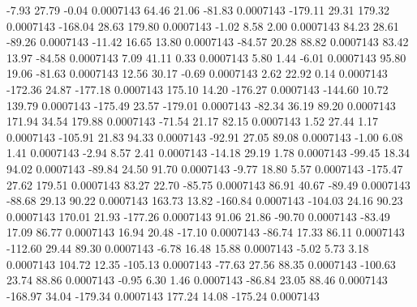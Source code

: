        -7.93       27.79       -0.04     0.0007143
       64.46       21.06      -81.83     0.0007143
     -179.11       29.31      179.32     0.0007143
     -168.04       28.63      179.80     0.0007143
       -1.02        8.58        2.00     0.0007143
       84.23       28.61      -89.26     0.0007143
      -11.42       16.65       13.80     0.0007143
      -84.57       20.28       88.82     0.0007143
       83.42       13.97      -84.58     0.0007143
        7.09       41.11        0.33     0.0007143
        5.80        1.44       -6.01     0.0007143
       95.80       19.06      -81.63     0.0007143
       12.56       30.17       -0.69     0.0007143
        2.62       22.92        0.14     0.0007143
     -172.36       24.87     -177.18     0.0007143
      175.10       14.20     -176.27     0.0007143
     -144.60       10.72      139.79     0.0007143
     -175.49       23.57     -179.01     0.0007143
      -82.34       36.19       89.20     0.0007143
      171.94       34.54      179.88     0.0007143
      -71.54       21.17       82.15     0.0007143
        1.52       27.44        1.17     0.0007143
     -105.91       21.83       94.33     0.0007143
      -92.91       27.05       89.08     0.0007143
       -1.00        6.08        1.41     0.0007143
       -2.94        8.57        2.41     0.0007143
      -14.18       29.19        1.78     0.0007143
      -99.45       18.34       94.02     0.0007143
      -89.84       24.50       91.70     0.0007143
       -9.77       18.80        5.57     0.0007143
     -175.47       27.62      179.51     0.0007143
       83.27       22.70      -85.75     0.0007143
       86.91       40.67      -89.49     0.0007143
      -88.68       29.13       90.22     0.0007143
      163.73       13.82     -160.84     0.0007143
     -104.03       24.16       90.23     0.0007143
      170.01       21.93     -177.26     0.0007143
       91.06       21.86      -90.70     0.0007143
      -83.49       17.09       86.77     0.0007143
       16.94       20.48      -17.10     0.0007143
      -86.74       17.33       86.11     0.0007143
     -112.60       29.44       89.30     0.0007143
       -6.78       16.48       15.88     0.0007143
       -5.02        5.73        3.18     0.0007143
      104.72       12.35     -105.13     0.0007143
      -77.63       27.56       88.35     0.0007143
     -100.63       23.74       88.86     0.0007143
       -0.95        6.30        1.46     0.0007143
      -86.84       23.05       88.46     0.0007143
     -168.97       34.04     -179.34     0.0007143
      177.24       14.08     -175.24     0.0007143

